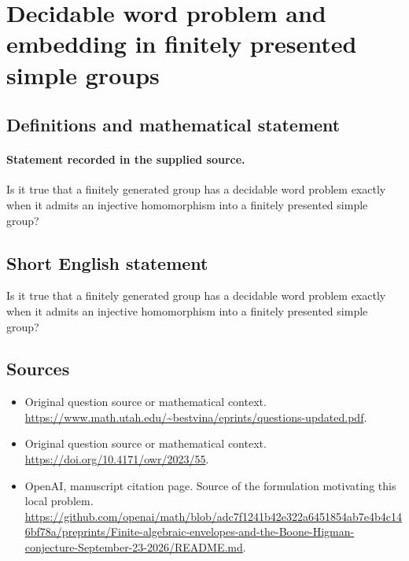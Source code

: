 \documentclass[11pt]{article}
\begin{document}
\section*{Decidable word problem and embedding in finitely presented simple groups}\label{statement}
\subsection{Definitions and mathematical statement}
\paragraph{Statement recorded in the supplied source.}
Is it true that a finitely generated group has a decidable word problem exactly when it admits an injective homomorphism into a finitely presented simple group?
\subsection{Short English statement}
Is it true that a finitely generated group has a decidable word problem exactly when it admits an injective homomorphism into a finitely presented simple group?
\subsection{Sources}
\begin{itemize}
\item[S1] Original question source or mathematical context.
\url{https://www.math.utah.edu/~bestvina/eprints/questions-updated.pdf}.
\item[S2] Original question source or mathematical context.
\url{https://doi.org/10.4171/owr/2023/55}.
\item[S3] OpenAI, manuscript citation page. Source of the formulation motivating this local problem.
\url{https://github.com/openai/math/blob/adc7f1241b42e322a6451854ab7e4b4c146bf78a/preprints/Finite-algebraic-envelopes-and-the-Boone-Higman-conjecture-September-23-2026/README.md}.
\end{itemize}
\end{document}
